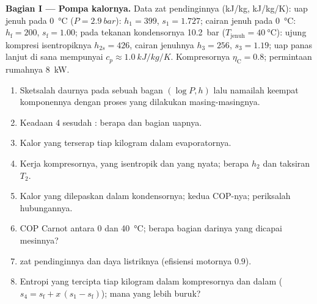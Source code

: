 \begin{problem}\label{pb:b2:open-systems:1}
\textbf{Bagian I --- Pompa kalornya.}
Data zat pendinginnya (\unit{kJ/kg}, \unit{kJ/kg/K}): uap jenuh pada
\qty{0}{\celsius} ($P = \qty{2.9}{bar}$): $h_1 = 399$, $s_1 = 1.727$;
cairan jenuh pada \qty{0}{\celsius}: $h_{\text{f}} = 200$, $s_{\text{f}} = 1.00$;
pada tekanan kondensornya \qty{10.2}{bar} ($T_{\text{jenuh}} = \qty{40}{\celsius}$):
ujung kompresi isentropiknya $h_{2s} = 426$, cairan jenuhnya $h_3 = 256$,
$s_3 = 1.19$; uap panas lanjut di sana mempunyai $c_p \approx \qty{1.0}{kJ/kg/K}$.
Kompresornya $\eta_{\text{C}} = 0.8$; permintaan rumahnya \qty{8}{kW}.
\begin{enumerate}
  \item Sketsalah daurnya pada sebuah bagan $(\log P, h)$ lalu namailah keempat
        komponennya dengan proses yang dilakukan masing-masingnya.
  \item Keadaan 4 sesudah : berapa  dan bagian uapnya.
  \item Kalor yang terserap tiap kilogram dalam evaporatornya.
  \item Kerja kompresornya, yang isentropik dan yang nyata; berapa $h_2$ dan taksiran
        $T_2$.
  \item Kalor yang dilepaskan dalam kondensornya; kedua COP-nya; periksalah
        hubungannya.
  \item COP Carnot antara \qty{0}{} dan \qty{40}{\celsius}; berapa bagian
        darinya yang dicapai mesinnya?
  \item {} zat pendinginnya dan daya listriknya (efisiensi
        motornya $0.9$).
  \item Entropi yang tercipta tiap kilogram dalam kompresornya dan dalam
         ($s_4 = s_{\text{f}} + x\,(s_1 - s_{\text{f}})$); mana yang
        lebih buruk?
\end{enumerate}


\end{problem}
